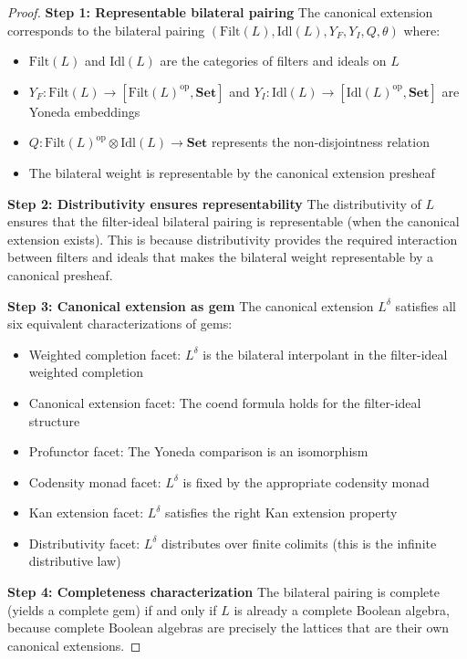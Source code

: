 \documentclass[11pt]{article}
\theoremstyle{plain}
\theoremstyle{definition}
\theoremstyle{remark}
\newcommand{\op}{\mathrm{op}}
\begin{document}
\begin{proof}
\textbf{Step 1: Representable bilateral pairing}
The canonical extension corresponds to the bilateral pairing $(\mathrm{Filt}(L), \mathrm{Idl}(L), Y_F, Y_I, Q, \theta)$ where:
\begin{itemize}
\item $\mathrm{Filt}(L)$ and $\mathrm{Idl}(L)$ are the categories of filters and ideals on $L$
\item $Y_F : \mathrm{Filt}(L) \to [\mathrm{Filt}(L)^{\op}, \mathbf{Set}]$ and $Y_I : \mathrm{Idl}(L) \to [\mathrm{Idl}(L)^{\op}, \mathbf{Set}]$ are Yoneda embeddings
\item $Q : \mathrm{Filt}(L)^{\op} \otimes \mathrm{Idl}(L) \to \mathbf{Set}$ represents the non-disjointness relation
\item The bilateral weight is representable by the canonical extension presheaf
\end{itemize}

\textbf{Step 2: Distributivity ensures representability}
The distributivity of $L$ ensures that the filter-ideal bilateral pairing is representable (when the canonical extension exists). This is because distributivity provides the required interaction between filters and ideals that makes the bilateral weight representable by a canonical presheaf.

\textbf{Step 3: Canonical extension as gem}
The canonical extension $L^{\delta}$ satisfies all six equivalent characterizations of gems:
\begin{itemize}
\item Weighted completion facet: $L^{\delta}$ is the bilateral interpolant in the filter-ideal weighted completion
\item Canonical extension facet: The coend formula holds for the filter-ideal structure
\item Profunctor facet: The Yoneda comparison is an isomorphism
\item Codensity monad facet: $L^{\delta}$ is fixed by the appropriate codensity monad
\item Kan extension facet: $L^{\delta}$ satisfies the right Kan extension property
\item Distributivity facet: $L^{\delta}$ distributes over finite colimits (this is the infinite distributive law)
\end{itemize}

\textbf{Step 4: Completeness characterization}
The bilateral pairing is complete (yields a complete gem) if and only if $L$ is already a complete Boolean algebra, because complete Boolean algebras are precisely the lattices that are their own canonical extensions.
\end{proof}
\end{document}
